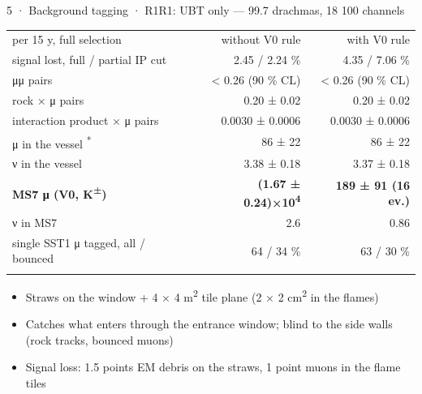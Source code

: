\begin{btframe}{5 · Background tagging · R1}{R1: UBT only — 99.7 drachmas, 18 100 channels}
{\centering {}\par}
\vspace{2.46pt}
\noindent \begin{minipage}[c]{0.5\linewidth}
{\fontsize{5.31pt}{6.90pt}\selectfont\setlength{\tabcolsep}{3.72pt}\renewcommand{\arraystretch}{1.42}
\begin{tabular}{lrr}
\textcolor{muted}{per 15 y, full selection} & \textcolor{muted}{without V0 rule} & \textcolor{muted}{with V0 rule} \\\headrule
signal lost, full / partial IP cut & 2.45 / 2.24 \% & 4.35 / 7.06 \% \\\rowrule
μμ pairs & < 0.26 (90 \% CL) & < 0.26 (90 \% CL) \\\rowrule
rock × μ pairs & 0.20 ± 0.02 & 0.20 ± 0.02 \\\rowrule
interaction product × μ pairs & 0.0030 ± 0.0006 & 0.0030 ± 0.0006 \\\rowrule
μ in the vessel \textsuperscript{*} & 86 ± 22 & 86 ± 22 \\\rowrule
ν in the vessel & 3.38 ± 0.18 & 3.37 ± 0.18 \\\rowrule
\rowcolor{tint}\bfseries MS7 μ (V0, K\textsuperscript{±}) & \bfseries (1.67 ± 0.24)×10\textsuperscript{4} & \bfseries 189 ± 91 (16 ev.) \\\rowrule
ν in MS7 & 2.6 & 0.86 \\\rowrule
single SST1 μ tagged, all / bounced & 64 / 34 \% & 63 / 30 \% \\\rowrule
\end{tabular}\par}
\end{minipage}%
\hfill%
\begin{minipage}[c]{0.5\linewidth}
{\fontsize{6.15pt}{8.60pt}\selectfont
\begin{itemize}
  \item Straws on the window + 4 × 4 m\textsuperscript{2} tile plane (2 × 2 cm\textsuperscript{2} in the flames)
  \item Catches what enters through the entrance window; blind to the side walls (rock tracks, bounced muons)
  \item Signal loss: 1.5 points EM debris on the straws, 1 point muons in the flame tiles
\end{itemize}}

\end{minipage}
\end{btframe}
